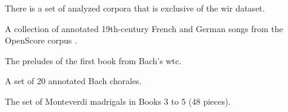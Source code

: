 

There is a set of analyzed corpora that is exclusive of the
\gls{wir} dataset.


A collection of annotated 19th-century French and German
songs from the OpenScore corpus
\textcite{gotham2022openscore}.


The preludes of the first book from Bach's \gls{wtc}. 


A set of 20 annotated Bach chorales. 


The set of Monteverdi madrigals in Books 3 to 5 (48 pieces).
